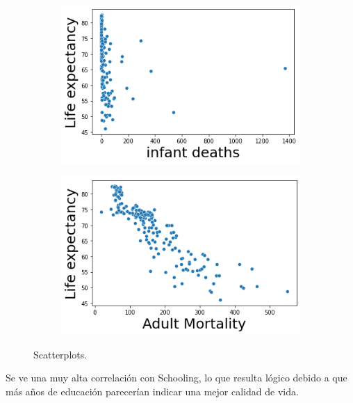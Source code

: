 \begin{itemize}
\begin{figure}[H]
\begin{subfigure}{0.15\linewidth}
              \end{subfigure}
                            \hfill
                \begin{subfigure}{0.15\linewidth}
                \centering
                \includegraphics[width=\textwidth]{img/37.png}
              \end{subfigure}
                          \hfill
                \begin{subfigure}{0.15\linewidth}
                \centering
                \includegraphics[width=\textwidth]{img/38.png}
              \end{subfigure}
               \caption{Scatterplots.}
               \label{fig: 13}
        \end{figure}

   Se ve una muy alta correlación con Schooling, lo que resulta lógico debido a que más años de educación parecerían indicar una mejor calidad de vida.
   

\end{itemize}
